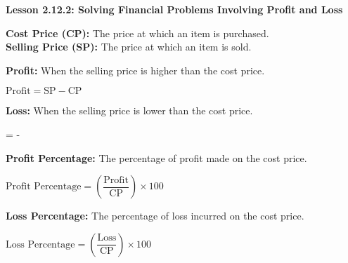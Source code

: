  \begin{center}
\textbf{Lesson 2.12.2: Solving Financial Problems Involving Profit and Loss}
\end{center}


 \noindent   \textbf{Cost Price (CP):} The price at which an item is purchased.\\
 \noindent    \textbf{Selling Price (SP):} The price at which an item is sold.

  \noindent   \textbf{Profit:} When the selling price is higher than the cost price.
  
{\centering $\text{Profit} = \text{SP} - \text{CP}$\par}

\noindent \textbf{Loss:} When the selling price is lower than the cost price.

{\centering {} =  - \par}

\noindent \textbf{Profit Percentage:} The percentage of profit made on the cost price.

{\centering $ \text{Profit Percentage} = \left( \dfrac{\text{Profit}}{\text{CP}} \right) \times 100 $\par}

\noindent \textbf{Loss Percentage:} The percentage of loss incurred on the cost price.

{\centering $ \text{Loss Percentage} = \left( \dfrac{\text{Loss}}{\text{CP}} \right) \times 100 $\par}

